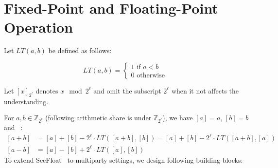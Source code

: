\chapter{Fixed-Point and Floating-Point Operation}
\label{cha:FpFl}

Let $LT\left(a,b\right) $ be defined as follows:

\begin{equation}
    LT\left(a,b\right)=
    \begin{cases}
        1 \text{ if } a <b \\
        0 \text{ otherwise }
    \end{cases}
\end{equation}

Let $\left[x\right] _{2^{\ell}}$ denotes $x \mod 2^{\ell}$ and omit the subscript $2^{\ell}$ when it not affects the understanding.

For $a, b \in \mathbb{Z}_{2^{\ell}}$ (following arithmetic share is under $\mathbb{Z}_{2^{\ell}}$), we have $\left[a\right]=a $, $\left[b\right]=b $ and ~\cite{makri2021rabbit}:
\begin{equation}
    \label{eq:LT}
    \begin{split}
        \left[a +b\right]  &=\left[a\right]  + \left[b\right] -2^{\ell} \cdot LT\left(\left[a+b\right] ,\left[b\right] \right)   = \left[a\right] +\left[b\right]  -2^{\ell} \cdot LT\left(\left[a+b\right]  ,\left[a\right] \right) \\
        \left[ a -b\right]  &=\left[a\right]  -\left[ b\right]  +2^{\ell} \cdot LT\left(\left[a\right] ,\left[b\right] \right)
    \end{split}
\end{equation}
To extend SecFloat~\cite{rathee2022secfloat} to multiparty settings, we design following building blocks:

